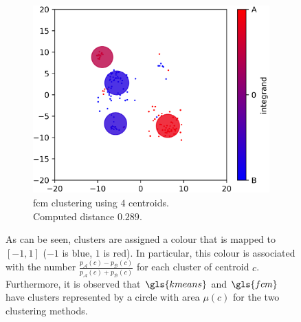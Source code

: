 \begin{modified}
\begin{figure}[p]
\begin{subfigure}{0.48\linewidth}
		\label{fig:kmeans_clustering}
	\end{subfigure}
	\begin{subfigure}{\linewidth}
		\includegraphics[width=\linewidth]{Figures/fcm_comparison.png}
		\caption[\gls{fcm} clustering, example of comparison]{\gls{fcm} clustering using $4$ centroids.\\ Computed distance $0.289$.}
		\label{fig:fcm_clustering}
	\end{subfigure}
	\caption[example of comparison using $3$ methods]{As can be seen, clusters are assigned a colour that is mapped to $[-1,1]$ ($-1$ is blue, $1$ is red). In particular, this colour is associated with the number $\frac{p_\mathcal{A}(c)-p_\mathcal{B}(c)}{p_\mathcal{A}(c)+p_\mathcal{B}(c)}$ for each cluster of centroid $c$. Furthermore, it is observed that $\gls{kmeans}$ and $\gls{fcm}$ have clusters represented by a circle with area $\mu(c)$ for the two clustering methods.}
\end{figure}
\end{modified}


